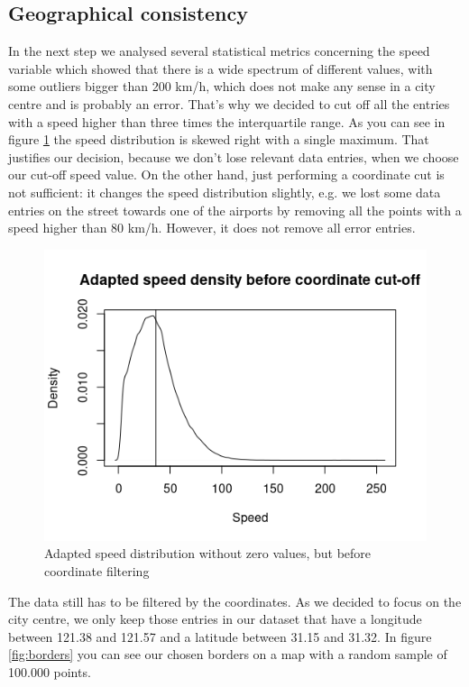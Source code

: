 \documentclass[11pt,conference,a4paper,twocolumns,romanappendices]{IEEEtran}
\begin{document}
\subsection{Geographical consistency}
In the next step we analysed several statistical metrics concerning the speed variable which showed that there is a wide spectrum of different values, with some outliers bigger than 200 km/h, which does not make any sense in a city centre and is probably an error. That's why we decided to cut off all the entries with a speed higher than three times the interquartile range. As you can see in figure \ref{fig:speed_before} the speed distribution is skewed right with a single maximum. That justifies our decision, because we don't lose relevant data entries, when we choose our cut-off speed value. On the other hand, just performing a coordinate cut is not sufficient: it changes the speed distribution slightly, e.g. we lost some data entries on the street towards one of the airports by removing all the points with a speed higher than 80 km/h. However, it does not remove all error entries. \\

\begin{figure}[h]
\centering
\includegraphics[scale=0.6]{density_before.png}
\caption{\label{fig:speed_before}Adapted speed distribution without zero values, but before coordinate filtering}
\end{figure}

The data still has to be filtered by the coordinates. As we decided to focus on the city centre, we only keep those entries in our dataset that have a longitude between 121.38 and 121.57 and a latitude between 31.15 and 31.32. In figure \ref{fig:borders} you can see our chosen borders on a map with a random sample of 100.000 points. \\
\end{document}
